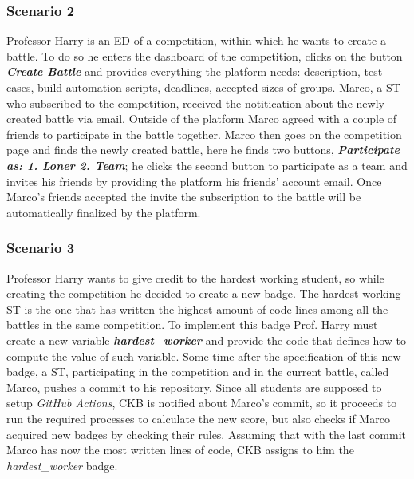 \subsubsection*{Scenario 2}
Professor Harry is an ED of a competition, within which he wants to create a battle. To do so he enters the dashboard of the competition, clicks on the button \textbf{\textit{Create Battle}} and provides everything the platform needs: description, test cases, build automation scripts, deadlines, accepted sizes of groups. Marco, a ST who subscribed to the competition, received the notitication about the newly created battle via email. Outside of the platform Marco agreed with a couple of friends to participate in the battle together. Marco then goes on the competition page and finds the newly created battle, here he finds two buttons, \textbf{\textit{Participate as: 1. Loner 2. Team}}; he clicks the second button to participate as a team and invites his friends by providing the platform his friends' account email. Once Marco's friends accepted the invite the subscription to the battle will be automatically finalized by the platform.

\subsubsection*{Scenario 3}
Professor Harry wants to give credit to the hardest working student, so while creating the competition he decided to create a new badge. The hardest working ST is the one that has written the highest amount of code lines among all the battles in the same competition. To implement this badge Prof. Harry must create a new variable \textbf{\textit{hardest\_worker}} and provide the code that defines how to compute the value of such variable. Some time after the specification of this new badge, a ST, participating in the competition and in the current battle, called Marco, pushes a commit to his repository. Since all students are supposed to setup \textit{GitHub Actions}, CKB is notified about Marco's commit, so it proceeds to run the required processes to calculate the new score, but also checks if Marco acquired new badges by checking their rules. Assuming that with the last commit Marco has now the most written lines of code, CKB assigns to him the \textit{hardest\_worker} badge.


